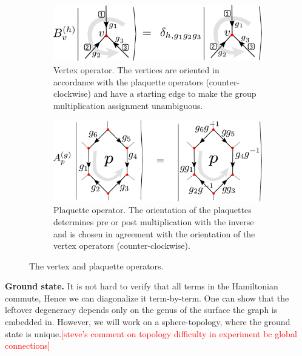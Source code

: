 \documentclass[two column]{article}
\newcommand{\caro}[1]{\textcolor{red}{[#1]}}
\begin{document}
\begin{figure}
    \centering
    \begin{subfigure}[b]{0.45\textwidth}
        \centering
        \includegraphics[width= \linewidth]{Figures/B_ops.pdf}
        \caption{Vertex operator. The vertices are oriented in accordance with the plaquette operators (counter-clockwise) and have a starting edge to make the group multiplication assignment unambiguous.}
        \label{eqn:Bs_def}
    \end{subfigure}\hfill
    \begin{subfigure}[b]{0.45\textwidth}
        \centering
        \includegraphics[width = \linewidth]{Figures/A_ops.pdf}
        \caption{Plaquette operator. The orientation of the plaquettes determines pre or post multiplication with the inverse and is chosen in agreement with the orientation of the vertex operators (counter-clockwise).}
        \label{eqn:As_def}
    \end{subfigure}\hfill
    \caption{The vertex and plaquette operators.}
    \label{fig:vertex_ops}
\end{figure}

\textbf{Ground state.}
It is not hard to verify that all terms in the Hamiltonian commute, Hence we can diagonalize it term-by-term. One can show that the leftover degeneracy depends only on the genus of the surface the graph is embedded in\cite{Kitaev_2003, cui2018topological}. However, we will work on a sphere-topology, where the ground state is unique.\caro{steve's comment on topology difficulty in experiment bc global connections}

\end{document}
